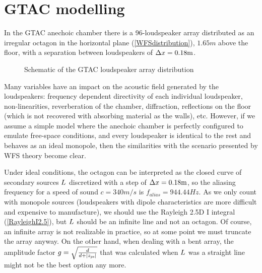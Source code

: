 \section{GTAC modelling}
In the GTAC anechoic chamber there is a 96-loudspeaker array distributed as an irregular octagon in the horizontal plane (\autoref{WFSdistribution}), $1.65 \si{m}$ above the floor, with a separation between loudspeakers of $\secondarySourceSeparation = 0.18 \si{m}$. 

\begin{figure}
	\centering
	\caption[WFS array distribution]{Schematic of the GTAC loudspeaker array distribution}
	\label{WFSdistribution}
\end{figure}

Many variables have an impact on the acoustic field generated by the loudspeakers: frequency dependent directivity of each individual loudspeaker, non-linearities, reverberation of the chamber, diffraction, reflections on the floor (which is not recovered with absorbing material as the walls), etc. However, if we assume a simple model where the anechoic chamber is perfectly configured to emulate free-space conditions, and every loudspeaker is identical to the rest and behaves as an ideal monopole, then the similarities with the scenario presented by WFS theory become clear.

Under ideal conditions, the octagon can be interpreted as the closed curve of secondary sources $\sectionTheo$ discretized with a step of $\secondarySourceSeparation = 0.18 \si{m}$, so the aliasing frequency for a speed of sound $c = 340 \si{m/s}$ is $f_\mathit{alias} = 944.44\si{Hz}$.  As we only count with monopole sources (loudspeakers with dipole characteristics are more difficult and expensive to manufacture), we should use the Rayleigh 2.5D I integral (\autoref{RayleighI2.5}), but $\sectionTheo$ should be an infinite line and not an octagon. Of course, an infinite array is not realizable in practice, so at some point we must truncate the array anyway. On the other hand, when dealing with a bent array, the amplitude factor $g = \sqrt{\frac{d}{d + \abs{\PosTheo[primarySource][z]}}}$ that was calculated when $\sectionTheo$ was a straight line might not be the best option any more.

